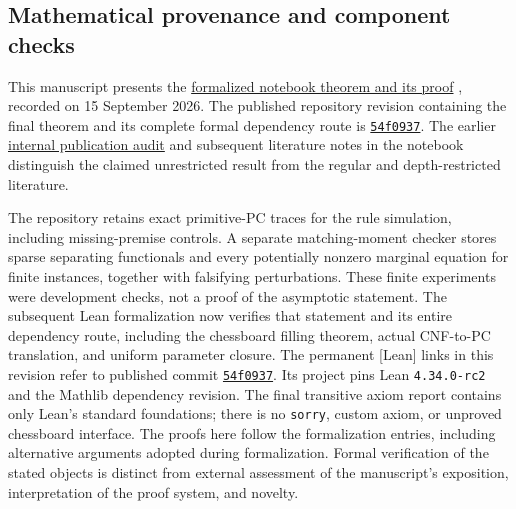 \subsection{Mathematical provenance and component checks}
This manuscript presents the
\href{https://kbr.is-a.dev/math-research/\#lean-publication-bit-PHP-superpolynomial}
{formalized notebook theorem and its proof}
, recorded on 15 September 2026.
The published repository revision containing the final theorem and its complete
formal dependency route is
\href{https://github.com/kbr-/math-research/tree/54f09378e97465522b7f1caf115f90ad1faa7a57}
{\texttt{54f0937}}.
The earlier
\href{https://kbr.is-a.dev/math-research/\#bit-PHP-publication-audit-verdict}
{internal publication audit} and subsequent literature notes in the
notebook distinguish the
claimed unrestricted result from the regular and depth-restricted
literature.

The repository retains exact primitive-PC traces for the rule
simulation, including missing-premise controls.
A separate matching-moment checker stores sparse separating
functionals and every potentially nonzero marginal equation for
finite instances, together with falsifying perturbations.
These finite experiments were development checks, not a proof of the asymptotic
statement. The subsequent Lean formalization now verifies that statement
and its entire dependency route, including the chessboard filling theorem,
actual CNF-to-PC translation, and uniform parameter closure. The permanent
[Lean] links in this revision refer to published commit
\href{https://github.com/kbr-/math-research/tree/54f09378e97465522b7f1caf115f90ad1faa7a57}
{\texttt{54f0937}}.
Its project pins Lean \texttt{4.34.0-rc2} and the Mathlib dependency revision.
The final transitive axiom report contains only Lean's standard foundations;
there is no \texttt{sorry}, custom axiom, or unproved chessboard interface.
The proofs here follow the formalization entries, including
alternative arguments adopted during formalization. Formal verification of
the stated objects is distinct from external assessment of the manuscript's
exposition, interpretation of the proof system, and novelty.

